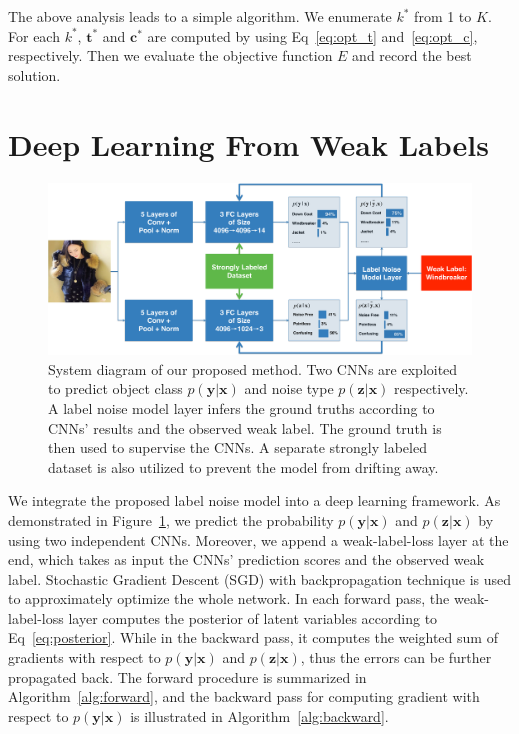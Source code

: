 \documentclass[10pt,twocolumn,letterpaper]{article}
\def\vec{\mathbf}
\begin{document}
The above analysis leads to a simple algorithm. We enumerate $k^*$ from 1 to $K$. For each $k^*$, $\vec{t}^*$ and $\vec{c}^*$ are computed by using Eq~\eqref{eq:opt_t} and~\eqref{eq:opt_c}, respectively. Then we evaluate the objective function $E$ and record the best solution.




\section{Deep Learning From Weak Labels} %
\label{sec:weak_label_deep_learning}
\begin{figure}
\begin{center}
\includegraphics[width=0.9\linewidth]{figure/diagram.pdf}
\end{center}
\caption{System diagram of our proposed method. Two CNNs are exploited to predict object class $p(\vec{y}|\vec{x})$ and noise type $p(\vec{z}|\vec{x})$ respectively. A label noise model layer infers the ground truths according to CNNs' results and the observed weak label. The ground truth is then used to supervise the CNNs. A separate strongly labeled dataset is also utilized to prevent the model from drifting away.}
\label{fig:framework}
\end{figure}

We integrate the proposed label noise model into a deep learning framework. As demonstrated in Figure~\ref{fig:framework}, we predict the probability $p(\vec{y}|\vec{x})$ and $p(\vec{z}|\vec{x})$ by using two independent CNNs. Moreover, we append a weak-label-loss layer at the end, which takes as input the CNNs' prediction scores and the observed weak label. Stochastic Gradient Descent (SGD) with backpropagation technique is used to approximately optimize the whole network. In each forward pass, the weak-label-loss layer computes the posterior of latent variables according to Eq~\eqref{eq:posterior}. While in the backward pass, it computes the weighted sum of gradients with respect to $p(\vec{y}|\vec{x})$ and $p(\vec{z}|\vec{x})$, thus the errors can be further propagated back. The forward procedure is summarized in Algorithm~\ref{alg:forward}, and the backward pass for computing gradient with respect to $p(\vec{y}|\vec{x})$ is illustrated in Algorithm~\ref{alg:backward}.
\end{document}

